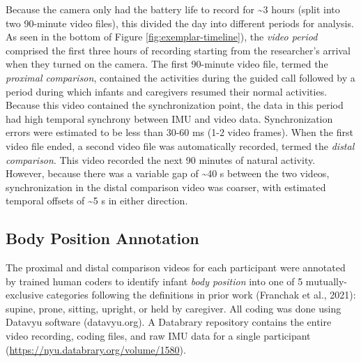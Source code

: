 \documentclass[
  man]{apa6}
\begin{document}
Because the camera only had the battery life to record for \textasciitilde3 hours (split into two 90-minute video files), this divided the day into different periods for analysis. As seen in the bottom of Figure \ref{fig:exemplar-timeline}), the \emph{video period} comprised the first three hours of recording starting from the researcher's arrival when they turned on the camera. The first 90-minute video file, termed the \emph{proximal comparison}, contained the activities during the guided call followed by a period during which infants and caregivers resumed their normal activities. Because this video contained the synchronization point, the data in this period had high temporal synchrony between IMU and video data. Synchronization errors were estimated to be less than 30-60 ms (1-2 video frames). When the first video file ended, a second video file was automatically recorded, termed the \emph{distal comparison}. This video recorded the next 90 minutes of natural activity. However, because there was a variable gap of \textasciitilde40 s between the two videos, synchronization in the distal comparison video was coarser, with estimated temporal offsets of \textasciitilde5 s in either direction.

\hypertarget{body-position-annotation}{%
\subsection{Body Position Annotation}\label{body-position-annotation}}

The proximal and distal comparison videos for each participant were annotated by trained human coders to identify infant \emph{body position} into one of 5 mutually-exclusive categories following the definitions in prior work (Franchak et al., 2021): supine, prone, sitting, upright, or held by caregiver. All coding was done using Datavyu software (datavyu.org). A Databrary repository contains the entire video recording, coding files, and raw IMU data for a single participant (\url{https://nyu.databrary.org/volume/1580}).
\end{document}
